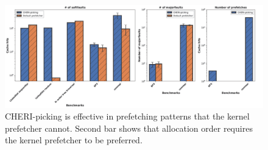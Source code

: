 \begin{figure}
\caption{CHERI-picking is effective in prefetching patterns that the kernel prefetcher cannot. Second bar shows that allocation order requires the kernel prefetcher to be preferred.}
\label{fig:evaluation}
\includegraphics[width=18cm]{images/evaluation_graphs_cropped.pdf}
\centering
\end{figure}